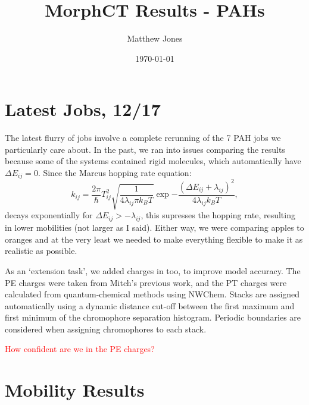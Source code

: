 \documentclass[12pt]{article}
\title{MorphCT Results - PAHs}
\author{Matthew Jones}
\date{\today}
\begin{document}
\maketitle


\section{Latest Jobs, 12/17}


The latest flurry of jobs involve a complete rerunning of the 7 PAH jobs we particularly care about.
In the past, we ran into issues comparing the results because some of the systems contained rigid molecules, which automatically have $\Delta E_{ij} = 0$.
Since the Marcus hopping rate equation:
\begin{equation}
    k_{ij} = \frac{2 \pi}{\hbar} T_{ij}^{2} \sqrt{\frac{1}{4 \lambda_{ij} \pi k_{B} T}} \exp{-\frac{\left( \Delta E_{ij} + \lambda_{ij} \right)^{2}}{4 \lambda_{ij} k_{B} T}},
\end{equation}
decays exponentially for $\Delta E_{ij} > - \lambda_{ij}$, this supresses the hopping rate, resulting in lower mobilities (not larger as I said).
Either way, we were comparing apples to oranges and at the very least we needed to make everything flexible to make it as realistic as possible.

As an `extension task', we added charges in too, to improve model accuracy.
The PE charges were taken from Mitch's previous work, and the PT charges were calculated from quantum-chemical methods using NWChem.
Stacks are assigned automatically using a dynamic distance cut-off between the first maximum and first minimum of the chromophore separation histogram.
Periodic boundaries are considered when assigning chromophores to each stack.


\textcolor{red}{How confident are we in the PE charges?}


\section{Mobility Results}
\end{document}

